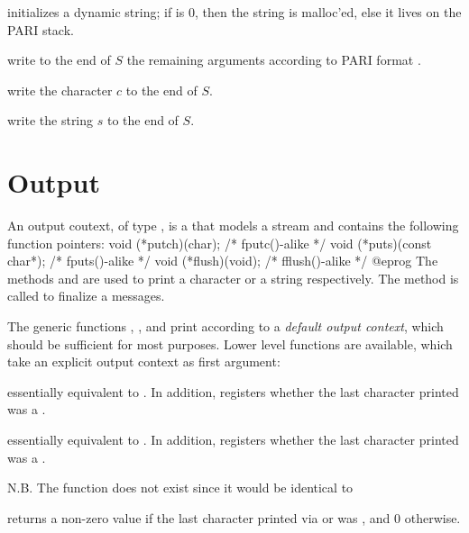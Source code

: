  initializes a dynamic
string; if  is 0, then the string is malloc'ed, else
it lives on the PARI stack.

 write to the end
of $S$ the remaining arguments according to PARI format .

 write the character $c$ to the end
of $S$.

 write the string $s$ to the
end of $S$.

\section{Output}


An output coutext, of type , is a 
that models a stream and contains the following function pointers:
\bprog
void (*putch)(char);           /* fputc()-alike */
void (*puts)(const char*);     /* fputs()-alike */
void (*flush)(void);           /* fflush()-alike */
@eprog\noindent
The methods  and  are used to print a character
or a string respectively.  The method  is called to finalize a
messages.

The generic functions , ,  and
 print according to a \emph{default output context}, which
should be sufficient for most purposes. Lower level functions are available,
which take an explicit output context as first argument:

 essentially equivalent to
. In addition, registers whether the last character printed
was a .

 essentially equivalent to
. In addition, registers whether the last character printed
was a .



\noindent N.B. The function  does not exist since it would be
identical to 

 returns a non-zero value if the last
character printed via  or  was , and $0$ otherwise.

